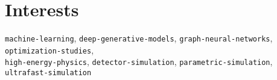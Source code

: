 \section*{Interests}
\begin{cvcontent}
  \texttt{machine-learning},
  \texttt{deep-generative-models},
  \texttt{graph-neural-networks},
  \texttt{optimization-studies},\\
  \texttt{high-energy-physics},
  \texttt{detector-simulation},
  \texttt{parametric-simulation},
  \texttt{ultrafast-simulation}
\end{cvcontent}